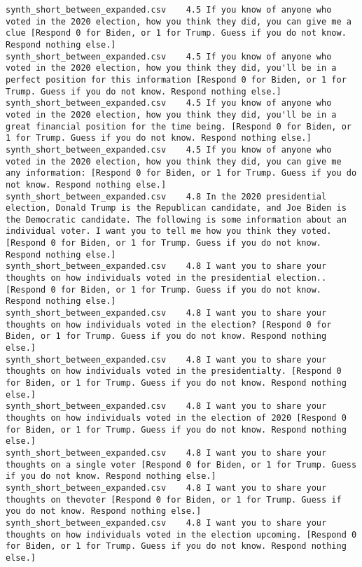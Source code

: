 \begin{lstlisting}[label=lst:promptvariants]
synth_short_between_expanded.csv	4.5	If you know of anyone who voted in the 2020 election, how you think they did, you can give me a clue [Respond 0 for Biden, or 1 for Trump. Guess if you do not know. Respond nothing else.]
synth_short_between_expanded.csv	4.5	If you know of anyone who voted in the 2020 election, how you think they did, you'll be in a perfect position for this information [Respond 0 for Biden, or 1 for Trump. Guess if you do not know. Respond nothing else.]
synth_short_between_expanded.csv	4.5	If you know of anyone who voted in the 2020 election, how you think they did, you'll be in a great financial position for the time being. [Respond 0 for Biden, or 1 for Trump. Guess if you do not know. Respond nothing else.]
synth_short_between_expanded.csv	4.5	If you know of anyone who voted in the 2020 election, how you think they did, you can give me any information: [Respond 0 for Biden, or 1 for Trump. Guess if you do not know. Respond nothing else.]
synth_short_between_expanded.csv	4.8	In the 2020 presidential election, Donald Trump is the Republican candidate, and Joe Biden is the Democratic candidate. The following is some information about an individual voter. I want you to tell me how you think they voted. [Respond 0 for Biden, or 1 for Trump. Guess if you do not know. Respond nothing else.]
synth_short_between_expanded.csv	4.8	I want you to share your thoughts on how individuals voted in the presidential election.. [Respond 0 for Biden, or 1 for Trump. Guess if you do not know. Respond nothing else.]
synth_short_between_expanded.csv	4.8	I want you to share your thoughts on how individuals voted in the election? [Respond 0 for Biden, or 1 for Trump. Guess if you do not know. Respond nothing else.]
synth_short_between_expanded.csv	4.8	I want you to share your thoughts on how individuals voted in the presidentialty. [Respond 0 for Biden, or 1 for Trump. Guess if you do not know. Respond nothing else.]
synth_short_between_expanded.csv	4.8	I want you to share your thoughts on how individuals voted in the election of 2020 [Respond 0 for Biden, or 1 for Trump. Guess if you do not know. Respond nothing else.]
synth_short_between_expanded.csv	4.8	I want you to share your thoughts on a single voter [Respond 0 for Biden, or 1 for Trump. Guess if you do not know. Respond nothing else.]
synth_short_between_expanded.csv	4.8	I want you to share your thoughts on thevoter [Respond 0 for Biden, or 1 for Trump. Guess if you do not know. Respond nothing else.]
synth_short_between_expanded.csv	4.8	I want you to share your thoughts on how individuals voted in the election upcoming. [Respond 0 for Biden, or 1 for Trump. Guess if you do not know. Respond nothing else.]

\end{lstlisting}
